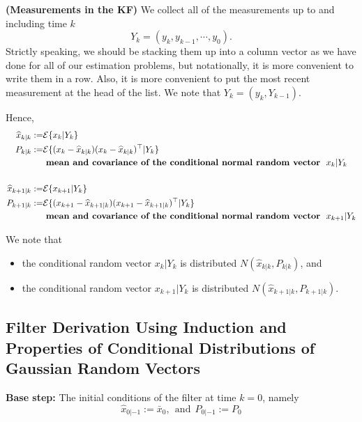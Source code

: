 \begin{definition}\textbf{(Measurements in the KF)} We collect all of the measurements up to and including time $k$ 
 $$Y_k = (y_k, y_{k-1}, \cdots, y_0).$$
 Strictly speaking, we should be stacking them up into a column vector as we have done for all of our estimation problems, but notationally, it is more convenient to write them in a row.  Also, it is more convenient to put the most recent measurement at the head of the list. We note that $Y_k = ( y_k, Y_{k-1}).$
\end{definition}

 Hence,
\begin{align*}
\widehat{x}_{k|k} :=& {\cal E} \{ x_k | Y_k \}\\
P_{k|k} :=& {\cal E} \{ (x_k-\widehat{x}_{k|k})(x_k-\widehat{x}_{k|k})^\top | Y_k \}\\
&~ \text{\bf mean and covariance of the conditional normal random vector} ~~x_{k} | Y_k\\
& \\
\widehat{x}_{k+1|k} := &{\cal E} \{  x_{k+1}  |  Y_k \}\\
P_{k+1|k}:=& {\cal E} \{ (x_{k+1}-\widehat{x}_{k+1|k})(x_{k+1}-\widehat{x}_{k+1|k})^\top | Y_k \}\\
&~ \text{\bf mean and covariance of the conditional normal random vector} ~~x_{k+1} | Y_k\\
\end{align*}

\begin{rem} We note that
\begin{itemize}
\setlength{\itemsep}{.5cm}
\item the conditional random vector $ x_k | Y_k $ is distributed $N(\widehat{x}_{k|k}, P_{k|k})$, and
\item  the conditional random vector $ x_{k+1} | Y_{k} $ is distributed $N(\widehat{x}_{k+1|k}, P_{k+1|k})$.
\end{itemize}
\end{rem}


\subsection{
 Filter Derivation Using Induction and Properties of Conditional Distributions of Gaussian Random Vectors
}

\textbf{Base step:} The initial conditions of the filter at time $k=0$, namely
$$ \widehat{x}_{0|-1} :=\bar{x}_0,~~\mbox{and}~~P_{0|-1}:=P_0$$

